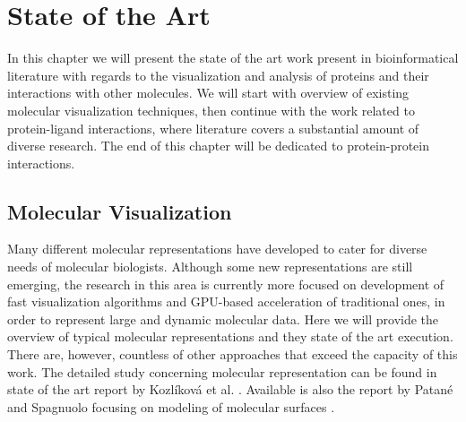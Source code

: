 \chapter{State of the Art}
\label{Sec:star}
In this chapter we will present the state of the art work present in bioinformatical literature with regards to the visualization and analysis of proteins and their interactions with other molecules. We will start with overview of existing molecular visualization techniques, then continue with the work related to protein-ligand interactions, where literature covers a substantial amount of diverse research. The end of this chapter will be dedicated to protein-protein interactions. 

\section{Molecular Visualization}
Many different molecular representations have developed to cater for diverse needs of molecular biologists. Although some new representations are still emerging, the research in this area is currently more focused on development of fast visualization algorithms and GPU-based acceleration of traditional ones, in order to represent large and dynamic molecular data. Here we will provide the overview of typical molecular representations and they state of the art execution. There are, however, countless of other approaches that exceed the capacity of this work. The detailed study concerning molecular representation can be found in state of the art report by Kozlíková et al. \cite{kozlikova2015visualization}. Available is also the report by Patané and Spagnuolo focusing on modeling of molecular surfaces \cite{patane2015state}.

